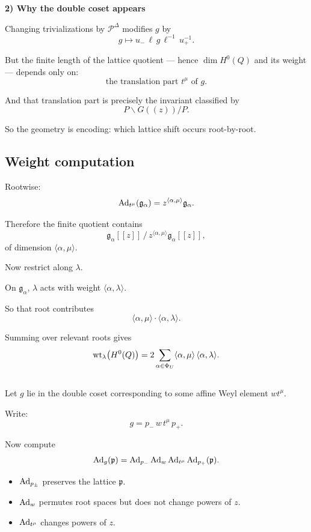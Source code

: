 \documentclass[12pt]{article}
\begin{document}
\noindent\textbf{2) Why the double coset appears}

Changing trivializations by $\mathcal{P}^\Delta$ modifies $g$ by
\[
g \mapsto u_-\,\ell\,g\,\ell^{-1}\,u_+^{-1}.
\]

But the finite length of the lattice quotient — hence $\dim H^0(Q)$ and its weight — depends only on:
\[
\text{the translation part } t^\mu \text{ of } g.
\]

And that translation part is precisely the invariant classified by
\[
P\backslash G((z))/P.
\]

So the geometry is encoding: which lattice shift occurs root-by-root.


\subsection{Weight computation}
Rootwise:
\[
\operatorname{Ad}_{t^\mu}(\mathfrak{g}_\alpha)
=
z^{\langle\alpha,\mu\rangle}\mathfrak{g}_\alpha.
\]

Therefore the finite quotient contains
\[
\mathfrak{g}_\alpha[[z]]
\,/\,
z^{\langle\alpha,\mu\rangle}\mathfrak{g}_\alpha[[z]],
\]
of dimension $\langle\alpha,\mu\rangle$.

Now restrict along $\lambda$.

On $\mathfrak{g}_\alpha$, $\lambda$ acts with weight $\langle\alpha,\lambda\rangle$.

So that root contributes
\[
\langle\alpha,\mu\rangle \cdot \langle\alpha,\lambda\rangle.
\]

Summing over relevant roots gives
\[
\operatorname{wt}_\lambda\bigl(H^0(Q)\bigr)
=
2\sum_{\alpha\in\Phi_U}
\langle\alpha,\mu\rangle\,\langle\alpha,\lambda\rangle.
\]

\subsection{}
Let $g$ lie in the double coset corresponding to some affine Weyl element $w t^\mu$.

Write:
\[
g = p_-\, w\, t^\mu\, p_+.
\]

Now compute
\[
\operatorname{Ad}_g(\mathfrak{p})
=
\operatorname{Ad}_{p_-}\operatorname{Ad}_w\operatorname{Ad}_{t^\mu}\operatorname{Ad}_{p_+}(\mathfrak{p}).
\]
\begin{itemize}
    \item $\operatorname{Ad}_{p_\pm}$ preserves the lattice $\mathfrak{p}$.
    \item $\operatorname{Ad}_w$ permutes root spaces but does not change powers of $z$.
    \item $\operatorname{Ad}_{t^\mu}$ changes powers of $z$.
\end{itemize}
\end{document}
